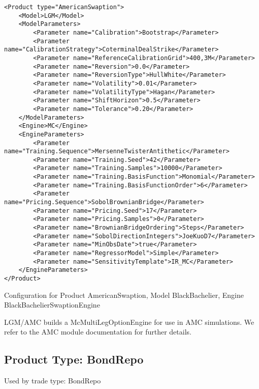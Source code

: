 \begin{longlisting}
\begin{verbatim}
<Product type="AmericanSwaption">
    <Model>LGM</Model>
    <ModelParameters>
        <Parameter name="Calibration">Bootstrap</Parameter>
        <Parameter name="CalibrationStrategy">CoterminalDealStrike</Parameter>
        <Parameter name="ReferenceCalibrationGrid">400,3M</Parameter>
        <Parameter name="Reversion">0.0</Parameter>
        <Parameter name="ReversionType">HullWhite</Parameter>
        <Parameter name="Volatility">0.01</Parameter>
        <Parameter name="VolatilityType">Hagan</Parameter>
        <Parameter name="ShiftHorizon">0.5</Parameter>
        <Parameter name="Tolerance">0.20</Parameter>
    </ModelParameters>
    <Engine>MC</Engine>
    <EngineParameters>
        <Parameter name="Training.Sequence">MersenneTwisterAntithetic</Parameter>
        <Parameter name="Training.Seed">42</Parameter>
        <Parameter name="Training.Samples">10000</Parameter>
        <Parameter name="Training.BasisFunction">Monomial</Parameter>
        <Parameter name="Training.BasisFunctionOrder">6</Parameter>
        <Parameter name="Pricing.Sequence">SobolBrownianBridge</Parameter>
        <Parameter name="Pricing.Seed">17</Parameter>
        <Parameter name="Pricing.Samples">0</Parameter>
        <Parameter name="BrownianBridgeOrdering">Steps</Parameter>
        <Parameter name="SobolDirectionIntegers">JoeKuoD7</Parameter>
        <Parameter name="MinObsDate">true</Parameter>
        <Parameter name="RegressorModel">Simple</Parameter>
        <Parameter name="SensitivityTemplate">IR_MC</Parameter>
    </EngineParameters>
</Product>
\end{verbatim}
\caption{Configuration for Product AmericanSwaption, Model BlackBachelier, Engine BlackBachelierSwaptionEngine}
\label{lst:peconfig_AmericanSwaption_LGM_MC}
\end{longlisting}

LGM/AMC builds a McMultiLegOptionEngine for use in AMC simulations. We refer to the AMC module documentation for further
details.

\subsection{Product Type: BondRepo}

Used by trade type: BondRepo

